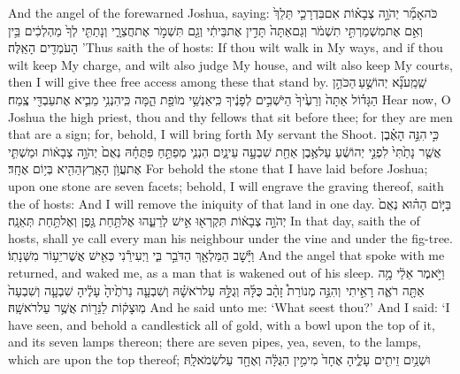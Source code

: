 \documentclass[11pt, openany]{book}
\begin{document}
{And the angel of the \lord\space forewarned Joshua, saying:}
{כֹּה\maqqaf אָמַ֞ר יְהֹוָ֣ה צְבָא֗וֹת אִם\maqqaf בִּדְרָכַ֤י תֵּלֵךְ֙ וְאִ֣ם אֶת\maqqaf מִשְׁמַרְתִּ֣י תִשְׁמֹ֔ר וְגַם\maqqaf אַתָּה֙ תָּדִ֣ין אֶת\maqqaf בֵּיתִ֔י וְגַ֖ם תִּשְׁמֹ֣ר אֶת\maqqaf חֲצֵרָ֑י וְנָתַתִּ֤י לְךָ֙ מַהְלְכִ֔ים בֵּ֥ין הָעֹמְדִ֖ים הָאֵֽלֶּה׃}
{’Thus saith the \lord\space of hosts: If thou wilt walk in My ways, and if thou wilt keep My charge, and wilt also judge My house, and wilt also keep My courts, then I will give thee free access among these that stand by.}
{שְֽׁמַֽע\maqqaf נָ֞א יְהוֹשֻׁ֣עַ \legarmeh  הַכֹּהֵ֣ן הַגָּד֗וֹל אַתָּה֙ וְרֵעֶ֙יךָ֙ הַיֹּשְׁבִ֣ים לְפָנֶ֔יךָ כִּֽי\maqqaf אַנְשֵׁ֥י מוֹפֵ֖ת הֵ֑מָּה כִּֽי\maqqaf הִנְנִ֥י מֵבִ֛יא אֶת\maqqaf עַבְדִּ֖י צֶֽמַח׃}
{Hear now, O Joshua the high priest, thou and thy fellows that sit before thee; for they are men that are a sign; for, behold, I will bring forth My servant the Shoot.}
{כִּ֣י \legarmeh  הִנֵּ֣ה הָאֶ֗בֶן אֲשֶׁ֤ר נָתַ֙תִּי֙ לִפְנֵ֣י יְהוֹשֻׁ֔עַ עַל\maqqaf אֶ֥בֶן אַחַ֖ת שִׁבְעָ֣ה עֵינָ֑יִם הִנְנִ֧י מְפַתֵּ֣חַ פִּתֻּחָ֗הּ נְאֻם֙ יְהֹוָ֣ה צְבָא֔וֹת וּמַשְׁתִּ֛י אֶת\maqqaf עֲוֺ֥ן הָאָֽרֶץ\maqqaf הַהִ֖יא בְּי֥וֹם אֶחָֽד׃}
{For behold the stone that I have laid before Joshua; upon one stone are seven facets; behold, I will engrave the graving thereof, saith the \lord\space of hosts: And I will remove the iniquity of that land in one day.}
{בַּיּ֣וֹם הַה֗וּא נְאֻם֙ יְהֹוָ֣ה צְבָא֔וֹת תִּקְרְא֖וּ אִ֣ישׁ לְרֵעֵ֑הוּ אֶל\maqqaf תַּ֥חַת גֶּ֖פֶן וְאֶל\maqqaf תַּ֥חַת תְּאֵנָֽה׃}
{In that day, saith the \lord\space of hosts, shall ye call every man his neighbour under the vine and under the fig-tree.}
\newperek
{}
{וַיָּ֕שׇׁב הַמַּלְאָ֖ךְ הַדֹּבֵ֣ר בִּ֑י וַיְעִירֵ֕נִי כְּאִ֖ישׁ אֲשֶׁר\maqqaf יֵע֥וֹר מִשְּׁנָתֽוֹ׃}
{And the angel that spoke with me returned, and waked me, as a man that is wakened out of his sleep.}
{וַיֹּ֣אמֶר אֵלַ֔י מָ֥ה אַתָּ֖ה רֹאֶ֑ה  רָאִ֣יתִי \pasek  וְהִנֵּ֣ה מְנוֹרַת֩ זָהָ֨ב כֻּלָּ֜הּ וְגֻלָּ֣הּ עַל\maqqaf רֹאשָׁ֗הּ וְשִׁבְעָ֤ה נֵרֹתֶ֙יהָ֙ עָלֶ֔יהָ שִׁבְעָ֤ה וְשִׁבְעָה֙ מֽוּצָק֔וֹת לַנֵּר֖וֹת אֲשֶׁ֥ר עַל\maqqaf רֹאשָֽׁהּ׃}
{And he said unto me: ‘What seest thou?’ And I said: ‘I have seen, and behold a candlestick all of gold, with a bowl upon the top of it, and its seven lamps thereon; there are seven pipes, yea, seven, to the lamps, which are upon the top thereof;}
{וּשְׁנַ֥יִם זֵיתִ֖ים עָלֶ֑יהָ אֶחָד֙ מִימִ֣ין הַגֻּלָּ֔ה וְאֶחָ֖ד עַל\maqqaf שְׂמֹאלָֽהּ׃}
\end{document}
